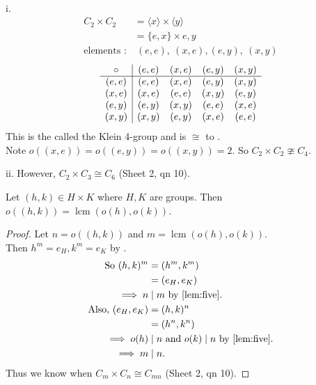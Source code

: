 \begin{example}
  
  ~

  i.
  \begin{align*}
    C_2 \times C_2 &= \langle x \rangle \times \langle y \rangle \\
    &= \{ e, x \} \times {e, y} \\
    \text{elements :} &\ (e, e),\ (x, e), (e, y),\ (x, y)
  \end{align*} 
  \begin{align*}
    \begin{array}{c | cccc}
      \circ & (e, e) & (x, e) & (e, y) & (x, y) \\
      \hline
      (e, e) & (e, e) & (x, e) & (e, y) & (x, y) \\
      (x, e) & (x, e) & (e, e) & (x, y) & (e, y) \\
      (e, y) & (e, y) & (x, y) & (e, e) & (x, e) \\
      (x, y) & (x, y) & (e, y) & (x, e) & (e, e)
    \end{array}
  \end{align*} 
  This is the called the Klein 4-group and is $\cong$ to .\\
  Note $o\left( (x, e) \right) = o\left( (e, y) \right) = o\left( (x, y) \right) = 2$. So $C_2 \times C_2 \ncong C_4$.

  ii. However, $C_2 \times C_3 \cong C_6$ (Sheet 2, qn 10).
\end{example} 

\begin{lemma}
    Let $(h, k) \in H \times K$ where $H, K$ are groups. 
    Then $o\left( (h, k) \right) = \operatorname{lcm} \left( o(h), o(k) \right)$.
\end{lemma} 

\begin{proof}
  Let $n = o\left( (h, k) \right)$ and $m = \operatorname{lcm} \left( o(h), o(k) \right)$.\\
  Then $h^m = e_H, k^m = e_K$ by .
  \begin{align*}
    \text{So } (h, k)^m &= (h^m, k^m) \\
    &= (e_H, e_K) \\
    \implies n &\mid m \text{ by } \ref{lem:five}. \\
    \text{Also, } (e_H, e_K) &= (h, k)^n \\
    &= (h^n, k^n) \\
    \implies o(h) &\mid n \text{ and } o(k) \mid n \text{ by } \ref{lem:five}. \\
    \implies m &\mid n.
  \end{align*} 
  Thus we know when $C_m \times C_n \cong C_{mn}$ (Sheet 2, qn 10).
\end{proof} 

